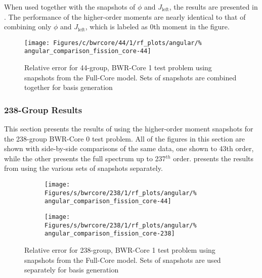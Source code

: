 When used together with the snapshots of $\phi$ and $J_{\text{left}}$, the 
results are presented in .  The 
performance of the higher-order moments are nearly identical to that of 
combining only $\phi$ and $J_{\text{left}}$, which is labeled as 0th moment in 
the figure.

\begin{figure*}[tb]
    \centering
    \texttt{[image: Figures/c/bwrcore/44/1/rf\_plots/angular/\%
        angular\_comparison\_fission\_core-44]}
    \caption{Relative error for 44-group, BWR-Core 1 test problem using 
        snapshots from the Full-Core model.  Sets of snapshots are combined 
        together for basis generation}
    \label{fig:BWR1-core-combined}
\end{figure*}

\subsubsection{238-Group Results}

This section presents the results of using the higher-order moment snapshots 
for the 238-group BWR-Core 0 test problem.  All of the figures in 
this section are shown with side-by-side comparisons of the same data, one 
shown to 43th order, while the other presents the full spectrum up to 
237$^{th}$ order.   presents the results 
from using the various sets of snapshots separately.

\begin{figure*}[tb]
    \centering
    \begin{subfigure}{0.5\textwidth}
        \centering
        \texttt{[image: Figures/s/bwrcore/238/1/rf\_plots/angular/\%
            angular\_comparison\_fission\_core-44]}
    \end{subfigure}%
    \begin{subfigure}{0.5\textwidth}
        \centering
        \texttt{[image: Figures/s/bwrcore/238/1/rf\_plots/angular/\%
            angular\_comparison\_fission\_core-238]}
    \end{subfigure}
    \caption{Relative error for 238-group, BWR-Core 1 test problem using 
        snapshots from the Full-Core model.  Sets of snapshots are 
        used separately for basis generation}
    \label{fig:BWR1-core-single-238}
\end{figure*}

